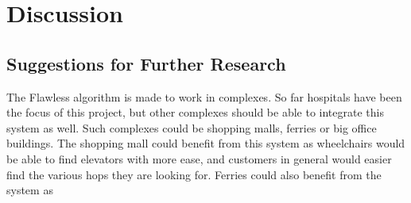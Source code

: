 \chapter{Discussion}


\section{Suggestions for Further Research}
The Flawless algorithm is made to work in complexes. So far hospitals have been the focus of this project, but other complexes should be able to integrate this system as well. Such complexes could be shopping malls, ferries or big office buildings. The shopping mall could benefit from this system as wheelchairs would be able to find elevators with more ease, and customers in general would easier find the various hops they are looking for. Ferries could also benefit from the system as 